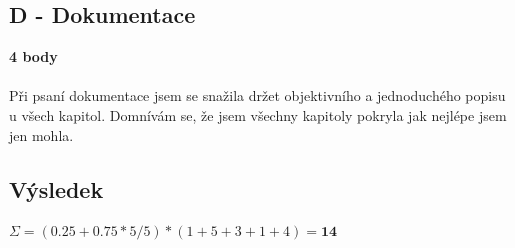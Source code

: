 \documentclass[]{fitiel} %
\begin{document}
    \subsection{D - Dokumentace}
    \textbf{4 body}
    \\\\
    Při psaní dokumentace jsem se snažila držet objektivního a jednoduchého popisu u všech kapitol. Domnívám se, že jsem všechny kapitoly pokryla jak nejlépe jsem jen mohla.

    \subsection{Výsledek}
    ${ \Sigma = (0.25 + 0.75 * 5/5) * (1 + 5 + 3 + 1 + 4) = \textbf{14}}$
\end{document}
